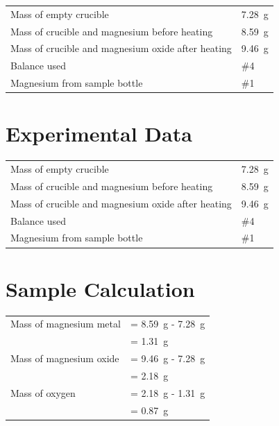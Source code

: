 \documentclass{article}
\begin{document}
	 
	 
	 
	 
	 
	 
	 
	 
	 
	 
	 
	 
	 
	 
	 
	 


	\begin{tabular}{ll}
		Mass of empty crucible & \SI{7.28}{\gram}\\
		Mass of crucible and magnesium before heating & \SI{8.59}{\gram}\\
		Mass of crucible and magnesium oxide after heating & \SI{9.46}{\gram}\\
		Balance used & \#4\\
		Magnesium from sample bottle & \#1
	\end{tabular}


	
	\section{Experimental Data}
	
	\begin{tabular}{ll}
		Mass of empty crucible & \SI{7.28}{\gram}\\
		Mass of crucible and magnesium before heating & \SI{8.59}{\gram}\\
		Mass of crucible and magnesium oxide after heating & \SI{9.46}{\gram}\\
		Balance used & \#4\\
		Magnesium from sample bottle & \#1
	\end{tabular}
	
	
	\section{Sample Calculation}
	
	\begin{tabular}{ll}
		Mass of magnesium metal & = \SI{8.59}{\gram} - \SI{7.28}{\gram}\\
		& = \SI{1.31}{\gram}\\
		Mass of magnesium oxide & = \SI{9.46}{\gram} - \SI{7.28}{\gram}\\
		& = \SI{2.18}{\gram}\\
		Mass of oxygen & = \SI{2.18}{\gram} - \SI{1.31}{\gram}\\
		& = \SI{0.87}{\gram}
	\end{tabular}
	
\end{document}
